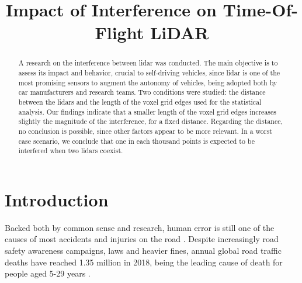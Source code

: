 \documentclass[extendedabs]{recpad2k}
\title{Impact of Interference on Time-Of-Flight LiDAR}
\begin{document}
\maketitle



\begin{abstract}
A research on the interference between \gls{lidar} was conducted. The main objective is to assess its impact and behavior, crucial to self-driving vehicles, since \gls{lidar} is one of the most promising sensors to augment the autonomy of vehicles, being adopted both by car manufacturers and research teams. 
Two conditions were studied: the distance between the \gls{lidar}s and the length of the voxel grid edges used for the statistical analysis. Our findings indicate that a smaller length of the voxel grid edges increases slightly the magnitude of the interference, for a fixed distance. Regarding the distance, no conclusion is possible, since other factors appear to be more relevant. In a worst case scenario, we conclude that one in each thousand points is expected to be interfered when two \gls{lidar}s coexist.
\end{abstract}

\section{Introduction}
\label{sec:intro}

Backed both by common sense and research, human error is still one of the causes of most accidents and injuries on the road \cite{Bimbraw2015, world2019global}. Despite increasingly road safety awareness campaigns, laws and heavier fines, annual global road traffic deaths have reached 1.35 million in 2018, being the leading cause of death for people aged 5-29 years \cite{world2019global}.
\end{document}
